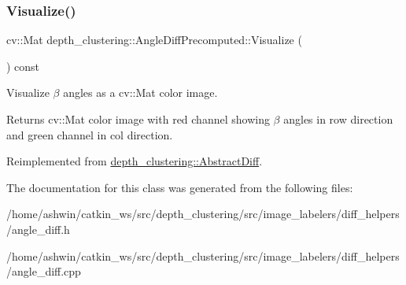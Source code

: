 \subsubsection{\texorpdfstring{Visualize()}{Visualize()}}
{\footnotesize\ttfamily cv\+::\+Mat depth\+\_\+clustering\+::\+Angle\+Diff\+Precomputed\+::\+Visualize (\begin{DoxyParamCaption}{ }\end{DoxyParamCaption}) const\hspace{0.3cm}{\ttfamily [virtual]}}



Visualize $\beta$ angles as a {\ttfamily cv\+::\+Mat} color image. 

\begin{DoxyReturn}{Returns}
{\ttfamily cv\+::\+Mat} color image with red channel showing $\beta$ angles in row direction and green channel in col direction. 
\end{DoxyReturn}


Reimplemented from \hyperlink{classdepth__clustering_1_1AbstractDiff_a45314bf711f35e53590af28bdfc45313}{depth\+\_\+clustering\+::\+Abstract\+Diff}.



The documentation for this class was generated from the following files\+:\begin{DoxyCompactItemize}
\item 
/home/ashwin/catkin\+\_\+ws/src/depth\+\_\+clustering/src/image\+\_\+labelers/diff\+\_\+helpers/angle\+\_\+diff.\+h\item 
/home/ashwin/catkin\+\_\+ws/src/depth\+\_\+clustering/src/image\+\_\+labelers/diff\+\_\+helpers/angle\+\_\+diff.\+cpp\end{DoxyCompactItemize}
